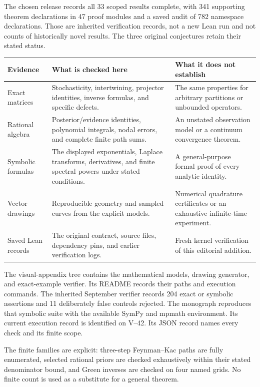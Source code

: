 The chosen release records all 33 scoped results complete, with 341 supporting theorem declarations in 47 proof modules and a saved audit of 782 namespace declarations. Those are inherited verification records, not a new Lean run and not counts of historically novel results. The three original conjectures retain their stated status.
\begin{tabularx}{\linewidth}{@{}>{\raggedright\arraybackslash}p{1.22in}YY@{}}
\toprule
Evidence & What is checked here & What it does not establish\\
\midrule
Exact matrices & Stochasticity, intertwining, projector identities, inverse formulas, and specific defects. & The same properties for arbitrary partitions or unbounded operators.\\
Rational algebra & Posterior/evidence identities, polynomial integrals, nodal errors, and complete finite path sums. & An unstated observation model or a continuum convergence theorem.\\
Symbolic formulas & The displayed exponentials, Laplace transforms, derivatives, and finite spectral powers under stated conditions. & A general-purpose formal proof of every analytic identity.\\
Vector drawings & Reproducible geometry and sampled curves from the explicit models. & Numerical quadrature certificates or an exhaustive infinite-time experiment.\\
Saved Lean records & The original contract, source files, dependency pins, and earlier verification logs. & Fresh kernel verification of this editorial addition.\\
\bottomrule
\end{tabularx}
The visual-appendix tree contains the mathematical models, drawing generator, and exact-example verifier. Its README records their paths and execution commands. The inherited September verifier records 204 exact or symbolic assertions and 11 deliberately false controls rejected. The monograph reproduces that symbolic suite with the available SymPy and mpmath environment. Its current execution record is identified on V--42. Its JSON record names every check and its finite scope.

The finite families are explicit: three-step Feynman--Kac paths are fully enumerated, selected rational priors are checked exhaustively within their stated denominator bound, and Green inverses are checked on four named grids. No finite count is used as a substitute for a general theorem.

